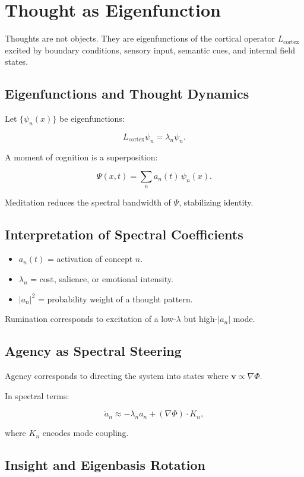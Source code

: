 \documentclass[12pt]{article}
\begin{document}
\chapter{Thought as Eigenfunction}

Thoughts are not objects.  
They are eigenfunctions of the cortical operator $L_{\text{cortex}}$ excited by
boundary conditions, sensory input, semantic cues, and internal field states.

\section{Eigenfunctions and Thought Dynamics}

Let $\{\psi_n(x)\}$ be eigenfunctions:

\[
L_{\text{cortex}} \psi_n = \lambda_n \psi_n.
\]

A moment of cognition is a superposition:

\[
\Psi(x,t) = \sum_n a_n(t)\, \psi_n(x).
\]

Meditation reduces the spectral bandwidth of $\Psi$, stabilizing identity.

\section{Interpretation of Spectral Coefficients}

\begin{itemize}
    \item $a_n(t)$ = activation of concept $n$.
    \item $\lambda_n$ = cost, salience, or emotional intensity.
    \item $|a_n|^2$ = probability weight of a thought pattern.
\end{itemize}

Rumination corresponds to excitation of a low-$\lambda$ but high-$|a_n|$ mode.

\section{Agency as Spectral Steering}

Agency corresponds to directing the system into states where
$\mathbf{v} \propto \nabla\Phi$.

In spectral terms:

\[
\dot{a}_n \approx -\lambda_n a_n + (\nabla\Phi)\cdot K_n,
\]

where $K_n$ encodes mode coupling.

\section{Insight and Eigenbasis Rotation}
\end{document}
